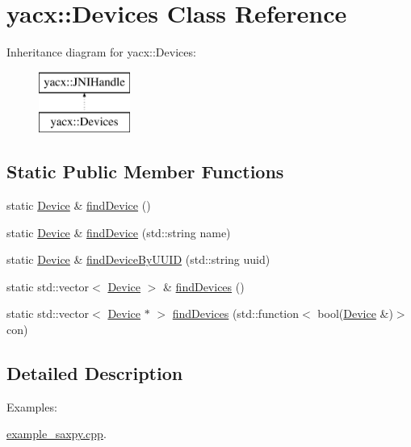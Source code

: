 \hypertarget{classyacx_1_1_devices}{}\section{yacx\+:\+:Devices Class Reference}
\label{classyacx_1_1_devices}
Inheritance diagram for yacx\+:\+:Devices\+:\begin{figure}[H]
\begin{center}
\leavevmode
\includegraphics[height=2.000000cm]{classyacx_1_1_devices}
\end{center}
\end{figure}
\subsection*{Static Public Member Functions}
\begin{DoxyCompactItemize}
\item 
static \hyperlink{classyacx_1_1_device}{Device} \& \hyperlink{classyacx_1_1_devices_abaae9839d12e79117e2fb292ee0689fb}{find\+Device} ()
\item 
static \hyperlink{classyacx_1_1_device}{Device} \& \hyperlink{classyacx_1_1_devices_a89eb86ce0ad70dd0390375ee04f549f6}{find\+Device} (std\+::string name)
\item 
static \hyperlink{classyacx_1_1_device}{Device} \& \hyperlink{classyacx_1_1_devices_afbeb807ea9fac2ba0be9c4fa812c5243}{find\+Device\+By\+U\+U\+ID} (std\+::string uuid)
\item 
static std\+::vector$<$ \hyperlink{classyacx_1_1_device}{Device} $>$ \& \hyperlink{classyacx_1_1_devices_aa1a44930c265be1c6593af6c42cd9c12}{find\+Devices} ()
\item 
static std\+::vector$<$ \hyperlink{classyacx_1_1_device}{Device} $\ast$ $>$ \hyperlink{classyacx_1_1_devices_a274f530c0b46a7fcdd13d36b55330541}{find\+Devices} (std\+::function$<$ bool(\hyperlink{classyacx_1_1_device}{Device} \&)$>$ con)
\end{DoxyCompactItemize}


\subsection{Detailed Description}
\begin{Desc}
\item[Examples\+: ]\par
\hyperlink{example_saxpy_8cpp-example}{example\+\_\+saxpy.\+cpp}.\end{Desc}


